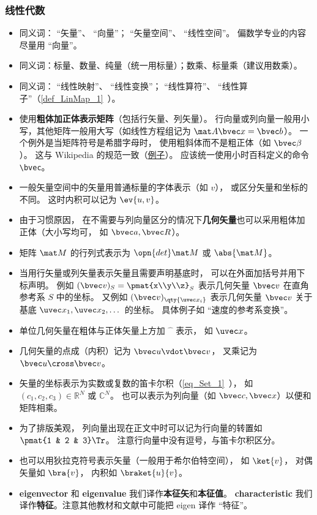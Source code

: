 \subsubsection{线性代数}
\begin{itemize}
\item 同义词： “矢量”、 “向量”； “矢量空间”、 “线性空间”。 偏数学专业的内容尽量用 “向量”。
\item 同义词：标量、数量、纯量（统一用标量）；数乘、标量乘（建议用数乘）。
\item 同义词： “线性映射”、 “线性变换”； “线性算符”、 “线性算子”（\autoref{def_LinMap_1}~）。
\item 使用\textbf{粗体加正体表示矩阵}（包括行矢量、列矢量）。 行向量或列向量一般用小写，其他矩阵一般用大写（如线性方程组记为 $\mat A \bvec x = \bvec b$）。 一个例外是当矩阵符号是希腊字母时， 使用粗斜体而不是粗正体（如 $\bvec \beta$）。 这与 Wikipedia 的规范一致（\href{https://en.wikipedia.org/wiki/Angular_acceleration}{例子}）。 应该统一使用小时百科定义的命令 \verb|\bvec|。
\item 一般矢量空间中的矢量用普通标量的字体表示（如 $v$）， 或区分矢量和坐标的不同。 这时内积可以记为 $\ev{u, v}$。
\item 由于习惯原因， 在不需要与列向量区分的情况下\textbf{几何矢量}也可以采用粗体加正体（大小写均可， 如 $\bvec a, \bvec R$）。
\item 矩阵 $\mat M$ 的行列式表示为 $\opn{det}\mat M$ 或 $\abs{\mat M}$。
\item 当用行矢量或列矢量表示矢量且需要声明基底时， 可以在外面加括号并用下标声明。 例如 $(\bvec v)_S = \pmat{x\\y\\z}_S$ 表示几何矢量 $\bvec v$ 在直角参考系 $S$ 中的坐标。 又例如 $(\bvec v)_{\qty{\uvec x_i}}$ 表示几何矢量 $\bvec v$ 关于基底 $\uvec x_1, \uvec x_2, \dots$ 的坐标。 具体例子如 “速度的参考系变换”。
\item 单位几何矢量在粗体与正体矢量上方加 $\hat{\phantom{x}}$ 表示， 如 $\uvec x$。
\item 几何矢量的点成（内积）记为 $\bvec u \vdot \bvec v$， 叉乘记为 $\bvec u \cross \bvec v$。
\item 矢量的坐标表示为实数或复数的笛卡尔积（\autoref{eq_Set_1}~）， 如 $(c_1, c_2, c_3) \in  \mathbb R^N$ 或 $\mathbb C^N$。 也可以表示为列向量（如 $\bvec c, \bvec x$）以便和矩阵相乘。
\item 为了排版美观， 列向量出现在正文中时可以记为行向量的转置如 $\pmat{1 & 2 & 3}\Tr$。 注意行向量中没有逗号，与笛卡尔积区分。
\item 也可以用狄拉克符号表示矢量（一般用于希尔伯特空间）， 如 $\ket{v}$， 对偶矢量如 $\bra{v}$， 内积如 $\braket{u}{v}$。
\item \textbf{eigenvector} 和 \textbf{eigenvalue} 我们译作\textbf{本征矢}和\textbf{本征值}。 \textbf{characteristic} 我们译作\textbf{特征}。注意其他教材和文献中可能把 eigen 译作 “特征”。
\end{itemize}

